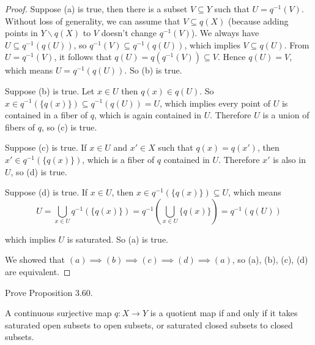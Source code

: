 \begin{proof}
	Suppose (a) is true, then there is a subset $V\subseteq Y$ such that $U = q^{-1}(V)$. Without loss of generality, we can assume that $V\subseteq q(X)$ (because adding points in $Y\smallsetminus q(X)$ to $V$ doesn't change $q^{-1}(V)$). We always have $U\subseteq q^{-1}(q(U))$, so $q^{-1}(V)\subseteq q^{-1}(q(U))$, which implies $V\subseteq q(U)$. From $U = q^{-1}(V)$, it follows that $q(U) = q(q^{-1}(V))\subseteq V$. Hence $q(U) = V$, which means $U = q^{-1}(q(U))$. So (b) is true.

	Suppose (b) is true. Let $x\in U$ then $q(x)\in q(U)$. So $x\in q^{-1}(\{ q(x) \})\subseteq q^{-1}(q(U)) = U$, which implies every point of $U$ is contained in a fiber of $q$, which is again contained in $U$. Therefore $U$ is a union of fibers of $q$, so (c) is true.

	Suppose (c) is true. If $x\in U$ and $x'\in X$ such that $q(x) = q(x')$, then $x'\in q^{-1}(\{q(x)\})$, which is a fiber of $q$ contained in $U$. Therefore $x'$ is also in $U$, so (d) is true.

	Suppose (d) is true. If $x\in U$, then $x\in q^{-1}(\{ q(x) \})\subseteq U$, which means
	\[
		U = \bigcup_{x\in U}q^{-1}(\{ q(x) \}) = q^{-1}\left(\bigcup_{x\in U}\{ q(x) \}\right) = q^{-1}(q(U))
	\]

	which implies $U$ is saturated. So (a) is true.

	We showed that $(a)\implies (b) \implies (c) \implies (d) \implies (a)$, so (a), (b), (c), (d) are equivalent.
\end{proof}

\begin{exercise}{3.61}\label{exercise:3.61}
	Prove Proposition 3.60.

	A continuous surjective map $q: X\to Y$ is a quotient map if and only if it takes saturated open subsets to open subsets, or saturated closed subsets to closed subsets.
\end{exercise}

